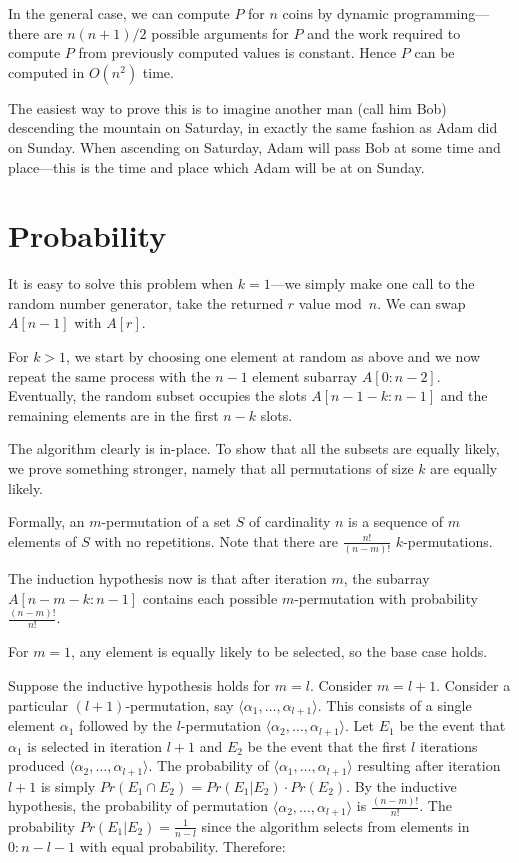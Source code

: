 In the general case, we can compute $P$ for $n$ coins by
dynamic programming---there are $n(n+1)/2$ possible arguments for $P$
and the work required to compute $P$ from previously computed values is constant. Hence $P$ can be computed in $O(n^2)$ time.

The easiest way to prove this is to imagine another man (call him Bob) 
descending the mountain on Saturday, in exactly the same fashion
as Adam did on Sunday.  When ascending on Saturday,
Adam will pass Bob at some time and place---this is the time and place which Adam
will be at on Sunday.



\chapter{ Probability}

It is easy to solve this problem when $k=1$---we simply make one call to the random number
generator, take the returned $r$ value mod~$n$. We can swap $A[n-1]$ with $A[r]$.

For $k>1$, we start by choosing one element at random as above and we now
repeat the same process with the $n-1$ element subarray $A[0:n-2]$. Eventually, the random subset
occupies the slots $A[n-1-k:n-1]$ and the remaining elements are in 
the first $n-k$ slots. 

The algorithm clearly is in-place. 
To show that all the subsets are equally likely, we prove something stronger, namely that all permutations of size $k$ are equally likely.

Formally, an $m$-permutation of a set $S$ of cardinality $n$ is a sequence of $m$
elements of $S$  with no repetitions.
Note that there are $\frac{n!}{(n-m)!}$ $k$-permutations. 

The induction hypothesis now is that after iteration $m$, 
the subarray $A[n-m-k:n-1]$ contains each possible $m$-permutation with probability
$\frac{(n-m)!}{n!}$. 

For $m=1$, any element is equally likely to be selected, so the base case holds.

Suppose the inductive hypothesis holds for $m=l$.  Consider $m=l+1$. 
Consider a particular $(l+1)$-permutation, say $\langle
\alpha_1,\ldots,\alpha_{l+1}\rangle$. This consists of a single element
$\alpha_1$ followed by the $l$-permutation
$\langle\alpha_2,\ldots,\alpha_{l+1}\rangle$. Let $E_1$ be the event that
$\alpha_1$ is selected in iteration $l+1$ and $E_2$ be the event that the first $l$ iterations produced $\langle \alpha_2,\ldots,\alpha_{l+1}\rangle$.
The probability of $\langle\alpha_1,\ldots,\alpha_{l+1}\rangle$ resulting after
iteration $l+1$ is simply $Pr( E_1 \cap E_2) = Pr( E_1 | E_2) \cdot Pr( E_2)$.
By the inductive hypothesis, the probability of permutation
$\langle\alpha_2,\ldots,\alpha_{l+1}\rangle$ is $\frac{(n-m)!}{n!}$. The
probability $Pr(E_1|E_2) =  \frac{1}{n-l}$ since the algorithm selects from elements in $0:n-l-1$ with equal probability. Therefore:

